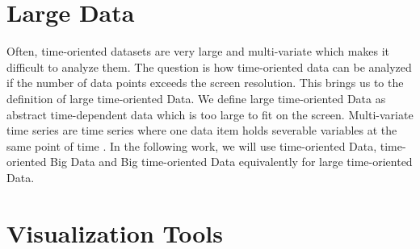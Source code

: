 \section{Large Data}

Often, time-oriented datasets are very large and multi-variate which makes it difficult to analyze them. The question is how time-oriented data can be analyzed if the number of data points exceeds the screen resolution. This brings us to the definition of large time-oriented Data. 
We define large time-oriented Data as abstract time-dependent data which is too large to fit on the screen. \cite{Shneiderman2008} Multi-variate time series are time series where one data item holds severable variables at the same point of time \cite{Aigner2011}.
In the following work, we will use time-oriented Data, time-oriented Big Data and Big time-oriented Data equivalently for large time-oriented Data. 

\section{Visualization Tools}